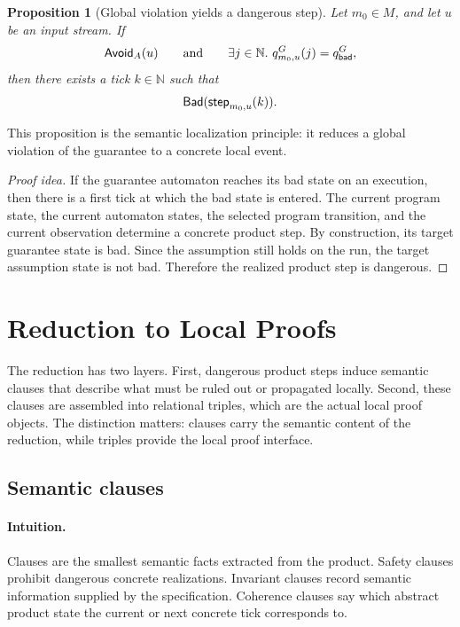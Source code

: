 \documentclass[acmsmall,screen]{acmart}
\theoremstyle{leftplain}
\newtheorem{proposition}[theorem]{Proposition}
\theoremstyle{leftdefinition}
\theoremstyle{leftremark}
\begin{document}
\begin{proposition}[Global violation yields a dangerous step]
\label{prop:global-to-dangerous}
Let $m_0 \in M$, and let $u$ be an input stream. If
\[
  \mathsf{Avoid}_A(u)
  \qquad\text{and}\qquad
  \exists j \in \mathbb{N}.\ q^G_{m_0,u}(j) = q^G_{\mathsf{bad}},
\]
then there exists a tick $k \in \mathbb{N}$ such that
\[
  \mathsf{Bad}(\mathsf{step}_{m_0,u}(k)).
\]
\end{proposition}

\noindent
This proposition is the semantic localization principle: it reduces a global
violation of the guarantee to a concrete local event.

\begin{proof}[Proof idea]
If the guarantee automaton reaches its bad state on an execution,
then there is a first tick at which the bad state is entered. The current
program state, the current automaton states, the selected program transition,
and the current observation determine a concrete product step. By construction,
its target guarantee state is bad. Since the assumption still holds on the run,
the target assumption state is not bad. Therefore the realized product step is
dangerous.
\end{proof}

\section{Reduction to Local Proofs}\label{sec:reduction}

The reduction has two layers. First, dangerous product steps induce semantic
clauses that describe what must be ruled out or propagated locally. Second,
these clauses are assembled into relational triples, which are the actual local
proof objects. The distinction matters: clauses carry the semantic content of
the reduction, while triples provide the local proof interface.

\subsection{Semantic clauses}
\paragraph{Intuition.}
Clauses are the smallest semantic facts extracted from the product. Safety
clauses prohibit dangerous concrete realizations. Invariant clauses record
semantic information supplied by the specification. Coherence clauses say which
abstract product state the current or next concrete tick corresponds to.
\end{document}
